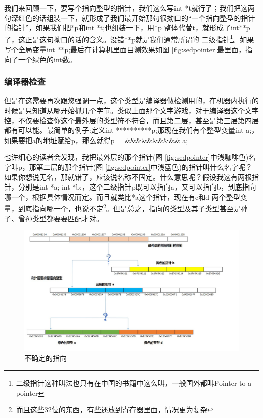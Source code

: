 \documentclass[11pt,twoside,a4paper,titlepage]{article}	%
\newcommand{\kw}[1]{\textcolor[rgb]{0.0,0.0,0.63}{ #1}}
\begin{document}
我们来回顾一下，要写个指向整型的指针，我们这么写int *t就行了；我们把这两句深红色的话组装一下，就形成了我们最开始那句很拗口的“一个指向整型的指针的指针”，如果我们把*p和int *t;也组装一下，用*p 整体代替t，就形成了int**p了，这正是这句拗口的话的含义。没错**p就是我们通常所谓的\kw{二级指针}\footnote{二级指针这种叫法也只有在中国的书籍中这么叫，一般国外都叫Pointer to a pointer}。如果写个全局变量int **p;最后在计算机里面目测效果如图 \ref{fig:sedpointer}最里面，指向了一个绿色的int数。

\subsubsection{编译器检查}
但是在这需要再次跟您强调一点，这个类型是编译器做检测用的，在机器内执行的时候是只知道从哪开始抓几个字节。类似上面那个文字游戏，对于编译器这个文字控，不仅要检查你这个最外层的类型符不符合，而且第二层，甚至是第三层第四层都有可以能。最简单的例子:定义int **********p;那现在我们有个整型变量int a;，如果要把a的地址赋给p，那么就得p = \&\&\&\&\&\&\&\&\&\& a;

也许细心的读者会发现，我把最外层的那个指针(图 \ref{fig:sedpointer}中浅咖啡色)名字叫p，那第二层的那个指针(图 \ref{fig:sedpointer}中浅蓝色)的指针叫什么名字呢？如果你想说无名，那就错了，应该说名称不固定。什么意思呢？假设我这有两根指针，分别是int *a; int *b;，这个二级指针p既可以指向a，又可以指向b，到底指向哪一个，根据具体情况而定。而且就类比*a这个指针，现在有c和d 两个整型变量，到底指向哪一个，也说不定\footnote{而且这些32位的东西，有些还放到寄存器里面，情况更为复杂}。但是总之，指向的类型及其子类型甚至是孙子、曾孙类型都要要匹配才对。

\begin{figure}[H]
\centering
\includegraphics[scale=.5]{../src/uncertain.jpg}
\caption{不确定的指向}
\label{fig:uncertain}
\end{figure}
\end{document}
